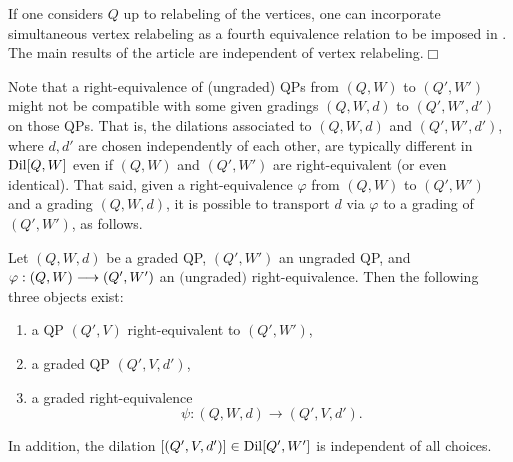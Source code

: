 \begin{remark} If one considers $Q$ up to relabeling of the vertices, one can incorporate simultaneous vertex relabeling as a fourth equivalence relation to be imposed in . The main results of the article are independent of vertex relabeling.\hfill$\Box$
\end{remark}

\noindent Note that a right-equivalence of (ungraded) QPs from $(Q,W)$ to $(Q',W')$ might not be compatible with some given gradings $(Q,W,d)$ to $(Q',W',d')$ on those QPs. That is, the dilations associated to $(Q,W,d)$ and $(Q',W',d')$, where $d,d'$ are chosen independently of each other, are typically different in $\operatorname{Dil}[Q,W]$ even if $(Q,W)$ and $(Q',W')$ are right-equivalent (or even identical). That said, given a right-equivalence $\varphi$ from $(Q,W)$ to $(Q',W')$ and a grading $(Q,W,d)$, it is possible to transport $d$ via $\varphi$ to a grading of $(Q',W')$, as follows.

\begin{lemma}\label{lem:rectification}
Let \((Q,W,d)\) be a graded QP, $(Q',W')$ an ungraded QP, and $\varphi:(Q,W)\longrightarrow(Q',W')$ an $($ungraded$)$ right-equivalence. Then the following three objects exist:
\begin{enumerate}
\item a QP $(Q',V)$ right-equivalent to $(Q',W')$,
\item a graded QP $(Q',V,d')$,
\item a graded right-equivalence
\[
 \psi:(Q,W,d)\longrightarrow(Q',V,d').
\]
\end{enumerate}
In addition, the dilation \([(Q',V,d')]\in\operatorname{Dil}[Q',W']\) is
independent of all choices.
\end{lemma}

